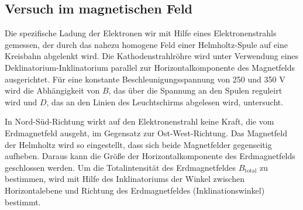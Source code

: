 \subsection{Versuch im magnetischen Feld}

Die spezifische Ladung der Elektronen wir mit Hilfe eines Elektronenstrahls gemessen, der durch das nahezu homogene Feld einer Helmholtz-Spule auf eine Kreisbahn abgelenkt wird.
Die Kathodenstrahlröhre wird unter Verwendung eines Deklinatorium-Inklinatorium parallel zur Horizontalkomponente des Magnetfelds ausgerichtet.
Für eine konstante Beschleunigungsspannung von 250 und 350 V wird die Abhängigkeit von $B$, das über die Spannung an den Spulen reguleirt wird und $D$, das an den Linien des Leuchtschirms abgelesen wird, untersucht.

In Nord-Süd-Richtung wirkt auf den Elektronenstrahl keine Kraft, die vom Erdmagnetfeld ausgeht, im Gegensatz zur Ost-West-Richtung.
Das Magnetfeld der Helmholtz wird so eingestellt, dass sich beide Magnetfelder gegenseitig aufheben.
Daraus kann die Größe der Horizontalkomponente des Erdmagnetfelds geschlossen werden.
Um die Totalintensität des Erdmagnetfeldes $B_\text{total}$ zu bestimmen, wird mit Hilfe des Inklinatoriums der Winkel zwischen Horizontalebene und Richtung des Erdmagnetfeldes (Inklinationswinkel) bestimmt.
